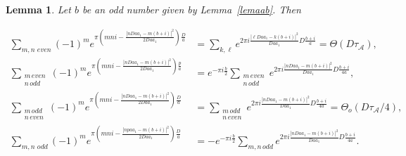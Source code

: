 \documentclass[11pt, reqno]{amsart}
\theoremstyle{plain}
\newtheorem{lemma}[theorem]{Lemma}
\theoremstyle{definition}
\numberwithin{equation}{section}
\begin{document}
\begin{lemma}\label{parity}
Let $b$ be an odd number given by Lemma~\ref{lemaab}. Then
 
     \begin{align}
        \sum_{m,n\,\,even}(-1)^{m}e^{\pi(mni-\frac{|nDaa_{1}-m(b+i)|^{2}}{2Daa_{1}})\frac{D}{a}}&=\sum_{k,\ell}e^{2\pi i\frac{|\ell Daa_{1}-k(b+i)|^{2}}{Daa_{1}}D\frac{b+i}{a}}=\Theta(D\tau_{\mathcal{A}}),\label{odd1}\\
        \sum_{\substack{m\,even\\n\,odd}}(-1)^{m}e^{\pi(mni-\frac{|nDaa_{1}-m(b+i)|^{2}}{2Daa_{1}})\frac{p}{a}}&=e^{-\pi i\frac{b}{2}}\sum_{\substack{m\,even\\n\,odd}}e^{2\pi i\frac{|nDaa_{1}-m(b+i)|^{2}}{Daa_{1}}D\frac{b+i}{4a}},\\
   \sum_{\substack{m\,odd\\n\,even}}(-1)^{m}e^{\pi(mni-\frac{|nDaa_{1}-m(b+i)|^{2}}{2Daa_{1}})\frac{D}{a}}&=\sum_{\substack{m\,odd\\n\,even}}e^{2\pi i\frac{|nDaa_{1}-m(b+i)|^{2}}{Daa_{1}}D\frac{b+i}{4a}}=\Theta_{o}(D\tau_{\mathcal{A}}/4),\label{odd2}\\
        \sum_{m,n\,\,odd}(-1)^{m}e^{\pi(mni-\frac{|npaa_{1}-m(b+i)|^{2}}{2Daa_{1}})\frac{D}{a}}&=-e^{-\pi i\frac{b}{2}}\sum_{m,n\,odd}e^{2\pi i\frac{|nDaa_{1}-m(b+i)|^{2}}{Daa_{1}}D\frac{b+i}{4a}}.
  \end{align}


\end{lemma}
\end{document}
